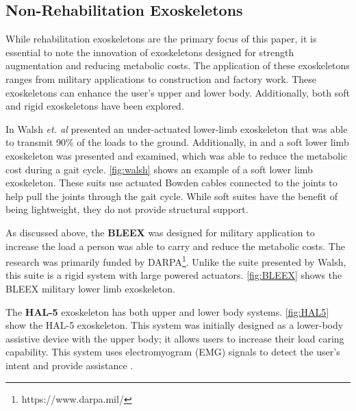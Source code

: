 \subsection{Non-Rehabilitation Exoskeletons}

While rehabilitation exoskeletons are the primary focus of this paper, it is essential to note the innovation of exoskeletons designed for strength augmentation and reducing metabolic costs. The application of these exoskeletons ranges from military applications to construction and factory work. These exoskeletons can enhance the user's upper and lower body. Additionally, both soft and rigid exoskeletons have been explored.

In \cite{walsh2006autonomous} Walsh \textit{et. al} presented an under-actuated lower-limb exoskeleton that was able to transmit 90\% of the loads to the ground. Additionally, in \cite{wehner2013lightweight} and \cite{asbeck2013biologically} a soft lower limb exoskeleton was presented and examined, which was able to reduce the metabolic cost during a gait cycle. \autoref{fig:walsh} shows an example of a soft lower limb exoskeleton. These suits use actuated Bowden cables connected to the joints to help pull the joints through the gait cycle. While soft suites have the benefit of being lightweight, they do not provide structural support.  



As discussed above, the \textbf{BLEEX} was designed for military application to increase the load a person was able to carry and reduce the metabolic costs. The research was primarily funded by DARPA\footnote{https://www.darpa.mil/}.  Unlike the suite presented by Walsh, this suite is a rigid system with large powered actuators. \autoref{fig:BLEEX} shows the BLEEX military lower limb exoskeleton.


The \textbf{HAL-5} exoskeleton has both upper and lower body systems. \autoref{fig:HAL5} show the HAL-5 exoskeleton. This system was initially designed as a lower-body assistive device with the upper body; it allows users to increase their load caring capability. This system uses electromyogram (EMG) signals to detect the user's intent and provide assistance \cite{casolo2008active}.


